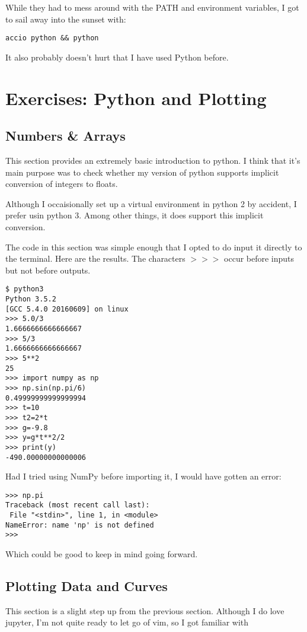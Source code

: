\documentclass[journal, a4paper]{IEEEtran}
\begin{document}
While they had to mess around with the PATH and environment variables, I got to
sail away into the sunset with:
\begin{lstlisting}
accio python && python
\end{lstlisting}

It also probably doesn't hurt that I have used Python before.

\section{Exercises: Python and Plotting}
\subsection{Numbers \& Arrays}
This section provides an extremely basic introduction to python. I think that
it's main purpose was to check whether my version of python supports implicit
conversion of integers to floats.

Although I occaisionally set up a virtual environment in python 2 by accident, I
prefer usin python 3. Among other things, it does support this implicit
conversion.

The code in this section was simple enough that I opted to do input it directly
to the terminal. Here are the results. The characters $>>>$ occur before inputs
but not before outputs.

\begin{lstlisting}
$ python3
Python 3.5.2 
[GCC 5.4.0 20160609] on linux
>>> 5.0/3
1.6666666666666667
>>> 5/3
1.6666666666666667
>>> 5**2
25
>>> import numpy as np
>>> np.sin(np.pi/6)
0.49999999999999994
>>> t=10
>>> t2=2*t
>>> g=-9.8
>>> y=g*t**2/2
>>> print(y)
-490.00000000000006
\end{lstlisting}

Had I tried using NumPy before importing it, I would have gotten an error:

\begin{verbatim}
>>> np.pi
Traceback (most recent call last):
 File "<stdin>", line 1, in <module>
NameError: name 'np' is not defined
>>> 
\end{verbatim}

Which could be good to keep in mind going forward.
\subsection{Plotting Data and Curves}
This section is a slight step up from the previous section. Although I do love
jupyter, I'm not quite ready to let go of vim, so I got familiar with 
\end{document}
